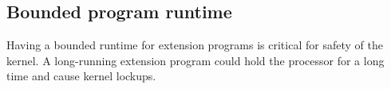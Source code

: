 \subsection{Bounded program runtime}
\label{principle:termination}
%
%
%

Having a bounded runtime for extension programs is critical for safety of the
    kernel.
A long-running extension program could hold the processor for a long time and
    cause kernel lockups.

